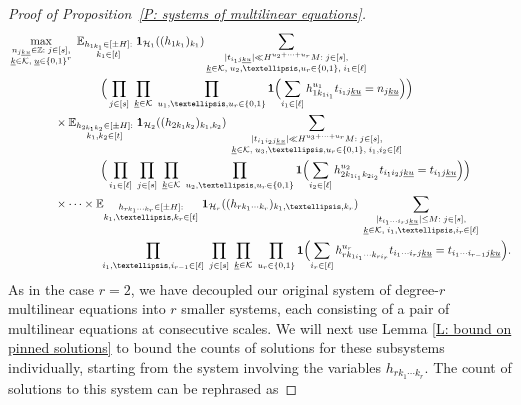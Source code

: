 \documentclass[10pt,a4paper]{amsart}
\newcommand{\Bigbrac}[1]{\Bigl( #1 \Bigr)}
\newcommand{\CH}{{\mathcal H}}
\newcommand{\CK}{{\mathcal K}}
\newcommand{\E}{{\mathbb E}}
\newcommand{\Z}{{\mathbb Z}}
\newcommand{\uk}{{\underline{k}}}
\newcommand{\uu}{{\underline{u}}}
\begin{document}
\begin{proof}[Proof of Proposition~\ref{P: systems of multilinear equations}]
\begin{align*}
            &\max_{\substack{n_{j\uk\uu}\in\Z:\; j\in[s],\\ \uk\in\CK,\; \uu\in\{0,1\}^r}}\; \E_{\substack{h_{1k_1}\in[\pm H]:\\ k_1\in[t]}}\; \mathbf{1}_{\CH_1}((h_{1 k_1})_{k_1})\sum_{\substack{|t_{i_1 j\uk\uu}|\ll H^{u_2+\cdots +u_r}M:\; j\in[s],\\ \uk\in\CK,\; u_2, \ldots, u_r\in\{0,1\},\; i_1\in[\ell]}}\\
        &\qquad\qquad\qquad\qquad\Big(\prod_{j\in[s]}\; \prod_{\substack{\uk\in\CK}}\; \prod_{\substack{u_1, \ldots, u_r\in\{0,1\}}}\mathbf{1}\Bigbrac{\sum\limits_{i_1\in[\ell]} h_{1k_{1i_1}}^{u_1} t_{i_1 j\uk\uu}= n_{j\uk\uu}}\Big)
        \\
        &\qquad\qquad\times \E_{\substack{h_{2k_1k_2}\in[\pm H]:\\ k_1,k_2\in[t]}}\; \mathbf{1}_{\CH_2}((h_{2 k_1 k_2})_{k_1, k_2})\; \sum_{\substack{|t_{i_1i_2 j\uk\uu}|\ll H^{u_3+\cdots+u_r}M:\; j\in[s],\\ \uk\in\CK,\; u_3, \ldots, u_r\in\{0,1\},\; i_1, i_2\in[\ell]}}\\
        &\qquad\qquad\qquad\qquad
        \Big(\prod_{i_1\in[\ell]}\; \prod_{j\in[s]}\; \prod_{\substack{\uk\in\CK}}\; \prod_{\substack{u_2, \ldots, u_r\in\{0,1\}}} \mathbf{1}\Bigbrac{\sum\limits_{i_2\in[\ell]} h_{2k_{1i_1}k_{2i_2}}^{u_2}t_{i_1 i_2 j\uk\uu} = t_{i_1 j\uk\uu}}\Big)\\
        &\qquad\qquad\times \cdots \times \E_{\substack{h_{rk_1\cdots k_r}\in[\pm H]:\\ k_1,\ldots, k_r\in[t]}}\; \mathbf{1}_{\CH_r}((h_{r k_1 \cdots k_r})_{k_1, \ldots, k_r})\; \sum_{\substack{|t_{i_1\cdots i_r j\uk\uu}|\leq M:\; j\in[s],\\ \uk\in\CK,\; i_1,\ldots,i_r\in[\ell]}}   \\
        &\qquad\qquad\qquad\qquad
        \prod_{i_1,\ldots, i_{r-1}\in[\ell]}\; \prod_{j\in[s]}\; \prod_{\substack{\uk\in\CK}}\; \prod_{\substack{u_r\in\{0,1\}}}
         \mathbf{1}\Bigbrac{\sum\limits_{i_r\in[\ell]} h_{rk_{1i_1}\cdots k_{r i_r}}^{u_r}t_{i_1 \cdots i_r j\uk\uu} = t_{i_1 \cdots i_{r-1} j\uk\uu}}.
\end{align*}
    As in the case $r=2$, we have decoupled our original system of degree-$r$ multilinear equations into $r$ smaller systems, each consisting of a pair of multilinear equations at consecutive scales.  We will next use Lemma \ref{L: bound on pinned solutions} to bound the counts of solutions for these subsystems individually, starting from the system involving the variables $h_{rk_1\cdots k_r}$. The count of solutions to this system can be rephrased as

\end{proof}
\end{document}
